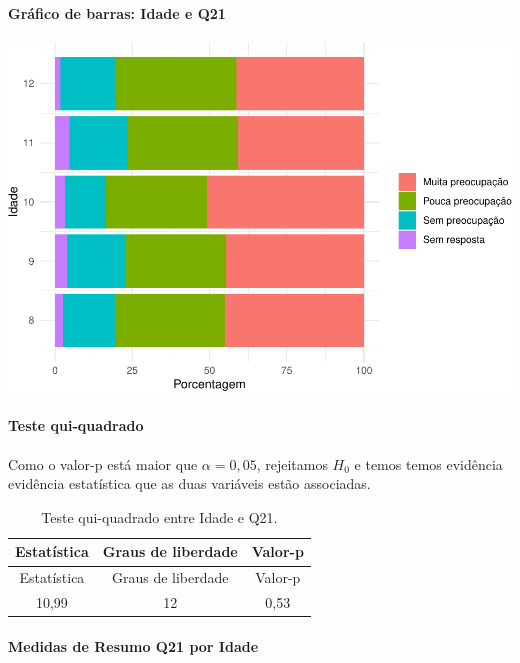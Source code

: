 \documentclass[]{article}
\let\oldparagraph\paragraph
\renewcommand{\paragraph}[1]{\oldparagraph{#1}\mbox{}}
\begin{document}
\hypertarget{gruxe1fico-de-barras-idade-e-q21}{%
\paragraph{Gráfico de barras: Idade e Q21}\label{gruxe1fico-de-barras-idade-e-q21}}

\begin{center}\includegraphics[width=0.75\linewidth]{relatorio_files/figure-latex/unnamed-chunk-341-1} \end{center}

\hypertarget{teste-qui-quadrado-39}{%
\paragraph{Teste qui-quadrado}\label{teste-qui-quadrado-39}}

Como o valor-p está maior que \(\alpha=0,05\), rejeitamos \(H_0\) e temos temos evidência evidência estatística que as duas variáveis estão associadas.

\begin{longtable}[]{@{}ccc@{}}
\caption{\label{tab:unnamed-chunk-342}Teste qui-quadrado entre Idade e Q21.}\tabularnewline
\toprule
Estatística & Graus de liberdade & Valor-p\tabularnewline
\midrule
\endfirsthead
\toprule
Estatística & Graus de liberdade & Valor-p\tabularnewline
\midrule
\endhead
10,99 & 12 & 0,53\tabularnewline
\bottomrule
\end{longtable}

\cleardoublepage

\hypertarget{medidas-de-resumo-q21-por-idade}{%
\paragraph{Medidas de Resumo Q21 por Idade}\label{medidas-de-resumo-q21-por-idade}}
\end{document}
